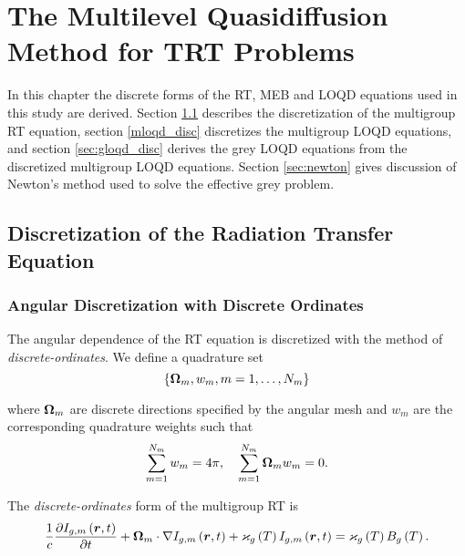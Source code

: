 \chapter{The Multilevel Quasidiffusion Method for TRT Problems }
\label{chap-two}
\newcommand{\fd}{\mathcal{D}_T}

In this chapter the discrete forms of the RT, MEB and LOQD equations used in this study are derived. Section \ref{sec:rt_disc} describes the discretization of the multigroup RT equation, section \ref{mloqd_disc} discretizes the multigroup LOQD equations, and section \ref{sec:gloqd_disc} derives the grey LOQD equations from the discretized multigroup LOQD equations. Section \ref{sec:newton} gives discussion of Newton's method used to solve the effective grey problem.

\section{Discretization of the Radiation Transfer Equation} \label{sec:rt_disc}

\subsection{Angular Discretization with Discrete Ordinates} \label{rte_ang_disc}
	The angular dependence of the RT equation is discretized with the method of \textit{discrete-ordinates}. We define a quadrature set
	\begin{equation}
		\left\{ \bm{\Omega}_m, w_m, m=1,\dots ,N_m \right\}
	\end{equation}
	
	where $\bm{\Omega}_m$ are discrete directions specified by the angular mesh and $w_m$ are the corresponding quadrature weights such that
	\begin{equation}
		\sum_{m=1}^{N_m}w_m = 4\pi, \quad \sum_{m=1}^{N_m}\bm{\Omega}_m w_m = 0.
	\end{equation}
	
	The \textit{discrete-ordinates} form of the multigroup RT  is
	\begin{equation}
		\frac{1}{c}\frac{\partial I_{g,m}\left(\bm{r},t\right)}{\partial t} + \bm{\Omega}_m\cdot\nabla I_{g,m}\left(\bm{r},t\right) + \varkappa_{g}\left( T\right)I_{g,m}\left(\bm{r},t\right) = \varkappa_{g}\left( T\right)B_{g}\left( T\right). \label{Sn_RTE}
	\end{equation}

